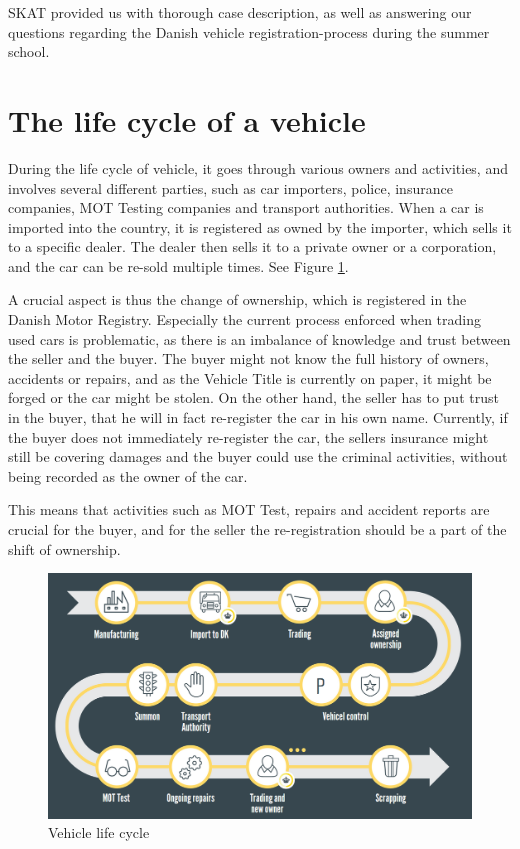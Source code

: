 \documentclass[oneside,a4paper,10pts,article]{memoir}
\begin{document}
SKAT provided us with thorough case description, as well as answering
our questions regarding the Danish vehicle registration-process during
the summer school.

\section{The life cycle of a vehicle}
During the life cycle of vehicle, it goes through various owners and
activities, and involves several different parties, such as car
importers, police, insurance companies, MOT Testing companies and
transport authorities. When a car is imported into the country, it is
registered as owned by the importer, which sells it to a specific
dealer. The dealer then sells it to a private owner or a corporation,
and the car can be re-sold multiple times. See Figure \ref{fig:lifecycle}.

A crucial aspect is thus the change of ownership, which is registered
in the Danish Motor Registry. Especially the current process enforced
when trading used cars is problematic, as there is an imbalance of
knowledge and trust between the seller and the buyer. The buyer might
not know the full history of owners, accidents or repairs, and as the
Vehicle Title is currently on paper, it might be forged or the car
might be stolen. On the other hand, the seller has to put trust in the
buyer, that he will in fact re-register the car in his own
name. Currently, if the buyer does not immediately re-register the
car, the sellers insurance might still be covering damages and the
buyer could use the criminal activities, without being recorded as the
owner of the car.

This means that activities such as MOT Test, repairs and accident
reports are crucial for the buyer, and for the seller the
re-registration should be a part of the shift of ownership.

\begin{figure}
  \centering
  \includegraphics[width=\textwidth]{lifecycle.png}
  \caption{Vehicle life cycle}
  \label{fig:lifecycle}
\end{figure}
\end{document}
